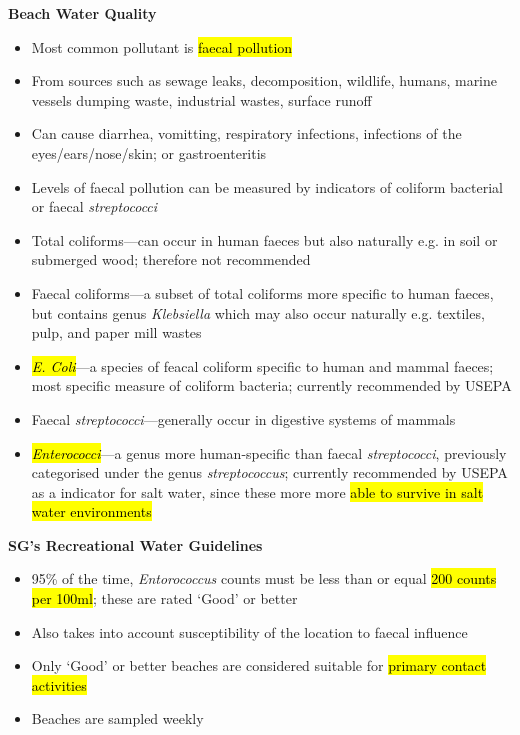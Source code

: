 \documentclass{article}
\newcommand{\headingsmall}[1]{{\small\textbf{#1}}}
\begin{document}
\begin{multicols*}{4}
\headingsmall{Beach Water Quality}
\begin{itemize} \itemsep -0.5em
    \item Most common pollutant is \hl{faecal pollution}
    \item From sources such as sewage leaks, decomposition, wildlife, humans, 
        marine vessels dumping waste, industrial wastes, surface runoff
    \item Can cause diarrhea, vomitting, respiratory infections, infections of
        the eyes/ears/nose/skin; or gastroenteritis
    \item Levels of faecal pollution can be measured by indicators of 
        coliform bacterial or faecal \textit{streptococci}
    \item Total coliforms---can occur in human faeces but also naturally e.g. 
        in soil or submerged wood; therefore not recommended
    \item Faecal coliforms---a subset of total coliforms more specific to
        human faeces, but contains genus \textit{Klebsiella} which may also
        occur naturally e.g. textiles, pulp, and paper mill wastes
    \item \hl{\textit{E. Coli}}---a species of feacal coliform specific to human
        and mammal faeces; most specific measure of coliform bacteria; currently
        recommended by USEPA
    \item Faecal \textit{streptococci}---generally occur in digestive systems
        of mammals
    \item \hl{\textit{Enterococci}}---a genus more human-specific than faecal
        \textit{streptococci}, previously categorised under the 
        genus \textit{streptococcus}; currently recommended by USEPA as a
        indicator for salt water, since these more more \hl{able to survive in
        salt water environments}
\end{itemize}

\headingsmall{SG's Recreational Water Guidelines}
\begin{itemize} \itemsep -0.5em
    \item 95\% of the time, \textit{Entorococcus} counts must be less than or
        equal \hl{200 counts per 100ml}; these are rated `Good' or better
    \item Also takes into account susceptibility of the location to faecal influence
    \item Only `Good' or better beaches are considered suitable for \hl{primary 
        contact activities}
    \item Beaches are sampled weekly
\end{itemize}


\end{multicols*}
\end{document}
